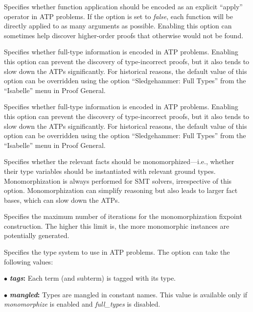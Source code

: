\documentclass[a4paper,12pt]{article}
\begin{document}
\begin{enum}
Specifies whether function application should be encoded as an explicit
``apply'' operator in ATP problems. If the option is set to \textit{false}, each
function will be directly applied to as many arguments as possible. Enabling
this option can sometimes help discover higher-order proofs that otherwise would
not be found.

Specifies whether full-type information is encoded in ATP problems. Enabling
this option can prevent the discovery of type-incorrect proofs, but it also
tends to slow down the ATPs significantly. For historical reasons, the default
value of this option can be overridden using the option ``Sledgehammer: Full
Types'' from the ``Isabelle'' menu in Proof General.

Specifies whether full-type information is encoded in ATP problems. Enabling
this option can prevent the discovery of type-incorrect proofs, but it also
tends to slow down the ATPs significantly. For historical reasons, the default
value of this option can be overridden using the option ``Sledgehammer: Full
Types'' from the ``Isabelle'' menu in Proof General.

Specifies whether the relevant facts should be monomorphized---i.e., whether
their type variables should be instantiated with relevant ground types.
Monomorphization is always performed for SMT solvers, irrespective of this
option. Monomorphization can simplify reasoning but also leads to larger fact
bases, which can slow down the ATPs.

Specifies the maximum number of iterations for the monomorphization fixpoint
construction. The higher this limit is, the more monomorphic instances are
potentially generated.

Specifies the type system to use in ATP problems. The option can take the
following values:

\begin{enum}
\item[$\bullet$] \textbf{\textit{tags}:} Each term (and subterm) is tagged with
its type.

\item[$\bullet$] \textbf{\textit{mangled}:} Types are mangled in constant names.
This value is available only if \textit{monomorphize} is enabled and
\textit{full\_types} is disabled.


\end{enum}
\end{enum}
\end{document}
